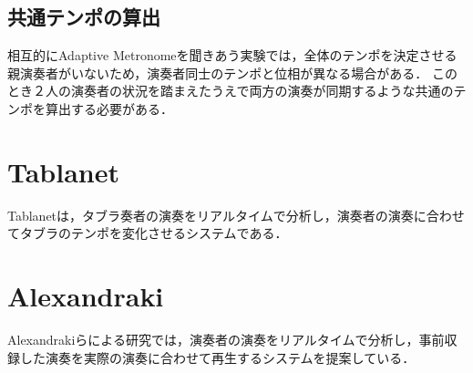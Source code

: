 \subsection{共通テンポの算出}
相互的にAdaptive Metronomeを聞きあう実験では，全体のテンポを決定させる親演奏者がいないため，演奏者同士のテンポと位相が異なる場合がある．
このとき２人の演奏者の状況を踏まえたうえで両方の演奏が同期するような共通のテンポを算出する必要がある．

\section{Tablanet}
Tablanet\cite{tablanet}は，タブラ奏者の演奏をリアルタイムで分析し，演奏者の演奏に合わせてタブラのテンポを変化させるシステムである．

\section{Alexandraki}
Alexandrakiらによる研究\cite{alexandraki:2013}\cite{alexandraki:2014}では，演奏者の演奏をリアルタイムで分析し，事前収録した演奏を実際の演奏に合わせて再生するシステムを提案している．
